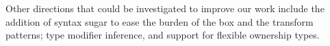 Other directions that could be investigated to improve our work include the addition of syntax sugar to ease the burden of the box and the transform patterns; type modifier inference, and support for flexible ownership types.


\begin{comment}
In literature, both static and runtime verification discuss
the correctness of common programming patterns in conventional languages.
Their struggle is proof of how hard it is to deal with the expressive power of unrestricted imperative object oriented programming.
 Here instead we build on languages using TMs and OCs to tame the use of imperative features. In this way
we have a fresh start where static variables are disallowed, unchecked exceptions require care to be captured, and I/O is allowed only when an opportune capability object is reachable.
Following those restrictions allow simpler reasoning.
The philosophy of our approach is to be like an extended type system: 
It is the programmer's decision
to annotate a field with a certain type,
or the class with a certain \validate.
If the program is well-typed, they are not questioned in their intent.
During execution the system is solely responsible for soundly enforcing the invariant protocol.
This is in sharp contrast with most work in RV, that is often conceived more as a tool to ease debugging:
both deciding properties and enforcing them is controlled by the programmers.
This is also different from static verification,
where the properties are ensured ahead of time instead of being enforced during execution.


Moreover, our approach does not aim to replace static or run-time verification,
but is a building block they can rely upon.
\end{comment}

